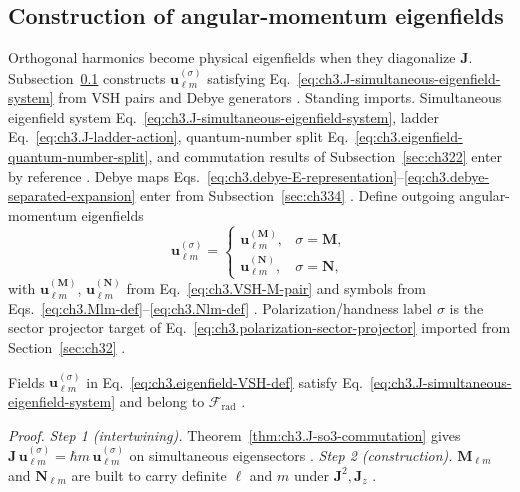 \subsection{Construction of angular-momentum eigenfields}
\label{sec:ch344}
Orthogonal harmonics become physical eigenfields when they diagonalize \(\mathbf{J}\). Subsection~\ref{sec:ch344}
constructs \(\mathbf{u}_{\ell m}^{(\sigma)}\) satisfying Eq.~\eqref{eq:ch3.J-simultaneous-eigenfield-system} from
VSH pairs and Debye generators \cite{hansen1988}.
Standing imports. Simultaneous eigenfield system Eq.~\eqref{eq:ch3.J-simultaneous-eigenfield-system}, ladder
Eq.~\eqref{eq:ch3.J-ladder-action}, quantum-number split Eq.~\eqref{eq:ch3.eigenfield-quantum-number-split}, and
commutation results of Subsection~\ref{sec:ch322} enter by reference \cite{jackson1999}. Debye maps
Eqs.~\eqref{eq:ch3.debye-E-representation}--\eqref{eq:ch3.debye-separated-expansion} enter from
Subsection~\ref{sec:ch334} \cite{tai1994}.
Define outgoing angular-momentum eigenfields
\begin{equation}
\label{eq:ch3.eigenfield-VSH-def}
\mathbf{u}_{\ell m}^{(\sigma)}
=
\begin{cases}
\mathbf{u}_{\ell m}^{(\mathbf{M})}, & \sigma=\mathbf{M},\\[4pt]
\mathbf{u}_{\ell m}^{(\mathbf{N})}, & \sigma=\mathbf{N},
\end{cases}
\end{equation}
with \(\mathbf{u}_{\ell m}^{(\mathbf{M})}\), \(\mathbf{u}_{\ell m}^{(\mathbf{N})}\) from
Eq.~\eqref{eq:ch3.VSH-M-pair} and symbols from Eqs.~\eqref{eq:ch3.Mlm-def}--\eqref{eq:ch3.Nlm-def}
\cite{stratton1941}. Polarization/handness label \(\sigma\) is the sector projector target of
Eq.~\eqref{eq:ch3.polarization-sector-projector} imported from Section~\ref{sec:ch32} \cite{belinfante1940}.
\begin{theorem}
\label{thm:ch3.vsh-J-eigenfields}
Fields \(\mathbf{u}_{\ell m}^{(\sigma)}\) in Eq.~\eqref{eq:ch3.eigenfield-VSH-def} satisfy
Eq.~\eqref{eq:ch3.J-simultaneous-eigenfield-system} and belong to \(\mathcal{F}_{\mathrm{rad}}\)
\cite{jackson1999}.
\end{theorem}
\noindent\textit{Proof.}
\emph{Step 1 (intertwining).} Theorem~\ref{thm:ch3.J-so3-commutation} gives \(\mathbf{J}\,\mathbf{u}_{\ell m}^{(\sigma)}=\hbar m\,\mathbf{u}_{\ell m}^{(\sigma)}\) on simultaneous eigensectors .
\emph{Step 2 (construction).} \(\mathbf{M}_{\ell m}\) and \(\mathbf{N}_{\ell m}\) are built to carry definite \(\ell\) and \(m\) under \(\mathbf{J}^{2},\mathbf{J}_{z}\) .
